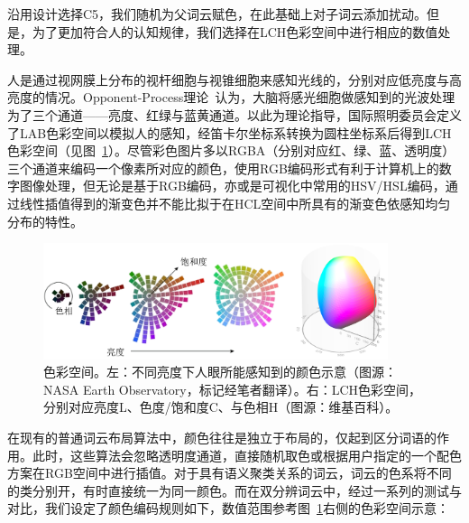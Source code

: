 沿用设计选择C5，我们随机为父词云赋色，在此基础上对子词云添加扰动。但是，为了更加符合人的认知规律，我们选择在LCH色彩空间中进行相应的数值处理。

人是通过视网膜上分布的视杆细胞与视锥细胞来感知光线的，分别对应低亮度与高亮度的情况。Opponent-Process理论~\supercite{hurvich1957opponent}认为，大脑将感光细胞做感知到的光波处理为了三个通道——亮度、红绿与蓝黄通道。以此为理论指导，国际照明委员会定义了LAB色彩空间以模拟人的感知，经笛卡尔坐标系转换为圆柱坐标系后得到LCH色彩空间（见图~\ref{fig:color_rationale}）。尽管彩色图片多以RGBA（分别对应红、绿、蓝、透明度）三个通道来编码一个像素所对应的颜色，使用RGB编码形式有利于计算机上的数字图像处理，但无论是基于RGB编码，亦或是可视化中常用的HSV/HSL编码，通过线性插值得到的渐变色并不能比拟于在HCL空间中所具有的渐变色依感知均匀分布的特性。
\begin{figure}[htbp]
	\centering
	\includegraphics[width=0.9\textwidth]{figures/color_spec.png}
	\caption{色彩空间。左：不同亮度下人眼所能感知到的颜色示意（图源：NASA Earth Observatory\protect\footnotemark，标记经笔者翻译）。右：LCH色彩空间，分别对应亮度L、色度/饱和度C、与色相H（图源：维基百科\protect\footnotemark）。}
	\label{fig:color_rationale}
\end{figure}



在现有的普通词云布局算法中，颜色往往是独立于布局的，仅起到区分词语的作用。此时，这些算法会忽略透明度通道，直接随机取色或根据用户指定的一个配色方案在RGB空间中进行插值。对于具有语义聚类关系的词云，词云的色系将不同的类分别开，有时直接统一为同一颜色。而在双分辨词云中，经过一系列的测试与对比，我们设定了颜色编码规则如下，数值范围参考图~\ref{fig:color_rationale}右侧的色彩空间示意：


